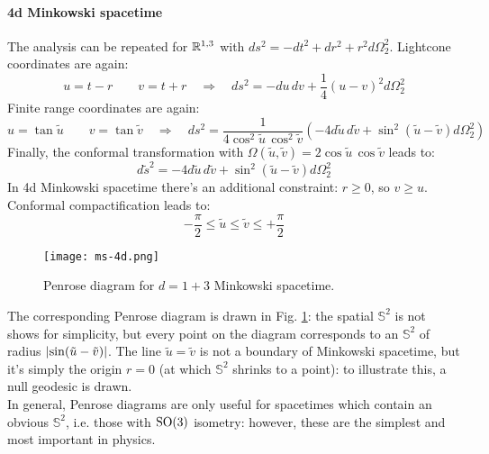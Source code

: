 \paragraph{4d Minkowski spacetime}

The analysis can be repeated for $ \mathbb{R}^{1,3} $ with $ ds^2 = -dt^2 + dr^2 + r^2 d\Omega_2^2 $. Lightcone coordinates are again:
\begin{equation*}
  u = t - r
  \qquad
  v = t + r
  \quad \Rightarrow \quad
  ds^2 = - du\, dv + \frac{1}{4} \left( u - v \right)^2 d\Omega_2^2
\end{equation*}
Finite range coordinates are again:
\begin{equation*}
   u = \tan \tilde{u}
  \qquad
  v = \tan \tilde{v}
  \quad \Rightarrow \quad
  ds^2 = \frac{1}{4\cos^2 \tilde{u}\, \cos^2 \tilde{v}} \left( -4 d\tilde{u}\, d\tilde{v} + \sin^2 (\tilde{u} - \tilde{v}) d\Omega_2^2 \right)
\end{equation*}
Finally, the conformal transformation with $ \Omega(\tilde{u},\tilde{v}) = 2 \cos \tilde{u}\, \cos \tilde{v} $ leads to:
\begin{equation*}
  d\tilde{s}^2 = - 4 d\tilde{u}\, d\tilde{v} + \sin^2 (\tilde{u} - \tilde{v}) d\Omega_2^2
\end{equation*}
In 4d Minkowski spacetime there's an additional constraint: $ r \ge 0 $, so $ v \ge u $. Conformal compactification leads to:
\begin{equation*}
  - \frac{\pi}{2} \le \tilde{u} \le \tilde{v} \le + \frac{\pi}{2}
\end{equation*}

\begin{figure}
  \centering
  \texttt{[image: ms-4d.png]}
  \caption{Penrose diagram for $ d = 1 + 3 $ Minkowski spacetime.}
  \label{ms-4d}
\end{figure}

The corresponding Penrose diagram is drawn in Fig. \ref{ms-4d}: the spatial $ \mathbb{S}^2 $ is not shows for simplicity, but every point on the diagram corresponds to an $ \mathbb{S}^2 $ of radius $ \left\lvert\sin (\tilde{u} - \tilde{v})\right\rvert $. The line $ \tilde{u} = \tilde{v} $ is not a boundary of Minkowski spacetime, but it's simply the origin $ r = 0 $ (at which $ \mathbb{S}^2 $ shrinks to a point): to illustrate this, a null geodesic is drawn.\\
In general, Penrose diagrams are only useful for spacetimes which contain an obvious $ \mathbb{S}^2 $, i.e. those with $ \mathrm{SO}(3) $ isometry: however, these are the simplest and most important in physics.

